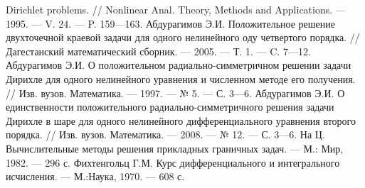 \begin{thebibliography}{111}
Dirichlet problems. // Nonlinear Anal. Theory, Methods and
Applications. --- 1995. --- V. 24. --- P. 159---163.
 Абдурагимов Э.И. Положительное решение двухточечной краевой задачи для
одного нелинейного оду четвертого порядка. // Дагестанский
математический сборник. --- 2005. --- Т. 1. --- C. 7---12.
 Абдурагимов Э.И. О положительном радиально-симметричном решении
 задачи Дирихле для одного нелинейного  уравнения и численном методе
 его получения. // Изв. вузов. Математика. --- 1997. --- № 5. --- С. 3---6.
Абдурагимов Э.И. О единственности положительного
радиально-симметричного решения задачи Дирихле в шаре для одного
нелинейного дифференциального уравнения второго порядка. // Изв.
вузов. Математика. --- 2008. --- № 12. --- С. 3---6.
 На Ц. Вычислительные методы решения прикладных граничных задач.
 --- М.: Мир, 1982. --- 296 с.
Фихтенгольц Г.М. Курс дифференциального и интегрального исчисления.
--- М.:Наука, 1970. --- 608 с.











\end{thebibliography}
